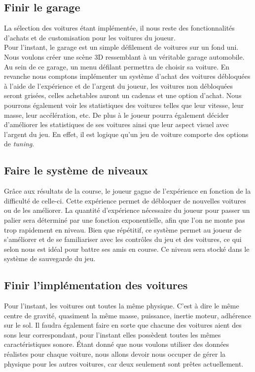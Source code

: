 \documentclass[12pt,a4paper]{article}
\begin{document}
        \subsection{Finir le garage}
            La sélection des voitures étant implémentée, il nous reste des fonctionnalités
            d'achats et de customisation pour les voitures du joueur.\\
            Pour l'instant, le garage est un simple défilement de voitures sur un fond uni.
            Nous voulons créer une scène 3D ressemblant à un véritable garage automobile.
            Au sein de ce garage, un menu défilant permettra de choisir sa voiture.
            En revanche nous comptons implémenter un système d'achat des voitures débloquées
            à l'aide de l'expérience et de l'argent du joueur, les voitures non débloquées
            seront grisées, celles achetables auront un cadenas et une option d'achat.
            Nous pourrons également voir les statistiques des voitures telles que leur vitesse,
            leur masse, leur accélération, etc. De plus à le joueur pourra également décider
            d'améliorer les statistiques de ses voitures ainsi que leur aspect visuel avec l'argent
            du jeu. En effet, il est logique qu'un jeu de voiture comporte des options de
            \textit{tuning}.

        \subsection{Faire le système de niveaux}
            Grâce aux résultats de la course, le joueur gagne de l'expérience en fonction de la
            difficulté de celle-ci. Cette expérience permet de débloquer de nouvelles voitures
            ou de les améliorer. La quantité d'expérience nécessaire du joueur pour passer un palier
            sera déterminé par une fonction exponentielle, afin que l'on ne monte pas trop rapidement 
            en niveau. Bien que répétitif, ce système permet au joueur 
            de s'améliorer et de se familiariser avec les contrôles du 
            jeu et des voitures, ce qui selon nous est idéal pour battre ses amis en course.
            Ce niveau sera stocké dans le système de sauvegarde du jeu.

        \subsection{Finir l'implémentation des voitures}
           Pour l'instant, les voitures ont toutes la même physique. C'est à dire le même
           centre de gravité, quasiment la même masse, puissance, inertie moteur, adhérence sur le 
           sol.
           Il faudra également faire en sorte que chacune des voitures aient des sons leur correspondant,
           pour l'instant elles possèdent toutes les mêmes caractéristiques sonore.
           Étant donné que nous voulons utiliser des données réalistes pour chaque voiture,
           nous allons devoir nous occuper de gérer la physique pour les autres voitures,
           car deux seulement sont prêtes actuellement.  
        
\end{document}

